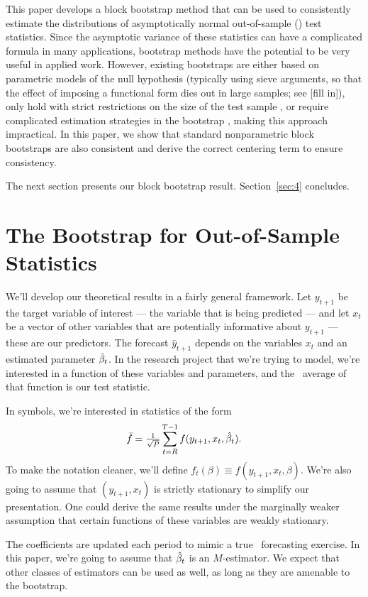 \documentclass[12pt,fleqn]{article}
\begin{document}
This paper develops a block bootstrap method that can be used to
consistently estimate the distributions of asymptotically normal
out-of-sample (\oos) test statistics. Since the asymptotic variance of
these statistics can have a complicated formula in many applications,
bootstrap methods have the potential to be very useful in applied
work. However, existing bootstraps are either based on parametric
models of the null hypothesis (typically using sieve arguments, so
that the effect of imposing a functional form dies out in large
samples; see [fill in]), only hold with strict restrictions on the
size of the test sample \citep{Whi:00,Han:05}, or require complicated
estimation strategies in the bootstrap \citep{CoS:07}, making this
approach impractical. In this paper, we show that standard
nonparametric block bootstraps are also consistent and derive the
correct centering term to ensure consistency.

The next section presents our block bootstrap result.
Section~\ref{sec:4} concludes.

\section{The Bootstrap for Out-of-Sample Statistics}

We'll develop our theoretical results in a fairly general
framework. Let $y_{t+1}$ be the target variable of interest --- the
variable that is being predicted --- and let $x_t$ be a vector of
other variables that are potentially informative about $y_{t+1}$ ---
these are our predictors. The forecast $\hat y_{t+1}$ depends on the
variables $x_t$ and an estimated parameter $\hat \beta_t$. In the research
project that we're trying to model, we're interested in a function of
these variables and parameters, and the \oos\ average of that function
is our test statistic.

In symbols, we're interested in statistics of the form
\begin{equation*}
  \bar f = \tfrac{1}{\sqrt{P}} \sum_{t=R}^{T-1} f(y_{t+1}, x_t, \hat \beta_t).
\end{equation*}
To make the notation cleaner, we'll define $f_t(\beta) \equiv f(y_{t+1},
x_t, \beta)$. We're also going to assume that $(y_{t+1}, x_t)$ is
strictly stationary to simplify our presentation. One could derive the
same results under the marginally weaker assumption that certain
functions of these variables are weakly stationary.

The coefficients are updated each period to mimic a true \oos\
forecasting exercise. In this paper, we're going to assume that
$\hat \beta_t$ is an $M$-estimator. We expect that other classes of
estimators can be used as well, as long as they are amenable to the
bootstrap.
\end{document}
